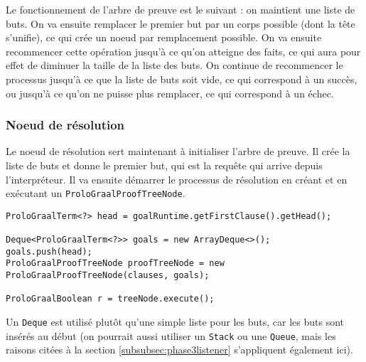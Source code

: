 \documentclass[../report.tex]{subfiles}
\begin{document}
Le fonctionnement de l'arbre de preuve est le suivant : on maintient une liste de buts. On va ensuite remplacer le premier but par un corps possible (dont la tête s'unifie), ce qui crée un noeud par remplacement possible. On va ensuite recommencer cette opération jusqu'à ce qu'on atteigne des faits, ce qui aura pour effet de diminuer la taille de la liste des buts. On continue de recommencer le processus jusqu'à ce que la liste de buts soit vide, ce qui correspond à un succès, ou jusqu'à ce qu'on ne puisse plus remplacer, ce qui correspond à un échec.
\subsubsection{Noeud de résolution}
Le noeud de résolution sert maintenant à initialiser l'arbre de preuve. Il crée la liste de buts et donne le premier but, qui est la requête qui arrive depuis l'interpréteur. Il va ensuite démarrer le processus de résolution en créant et en exécutant un \texttt{ProloGraalProofTreeNode}.
\begin{verbatim}
ProloGraalTerm<?> head = goalRuntime.getFirstClause().getHead();

Deque<ProloGraalTerm<?>> goals = new ArrayDeque<>();
goals.push(head);
ProloGraalProofTreeNode proofTreeNode = new ProloGraalProofTreeNode(clauses, goals);

ProloGraalBoolean r = treeNode.execute();
\end{verbatim}
Un \texttt{Deque} est utilisé plutôt qu'une simple liste pour les buts, car les buts sont insérés au début (on pourrait aussi utiliser un \texttt{Stack} ou une \texttt{Queue}, mais les raisons citées à la section \ref{subsubsec:phase3listener} s'appliquent également ici).
\end{document}
